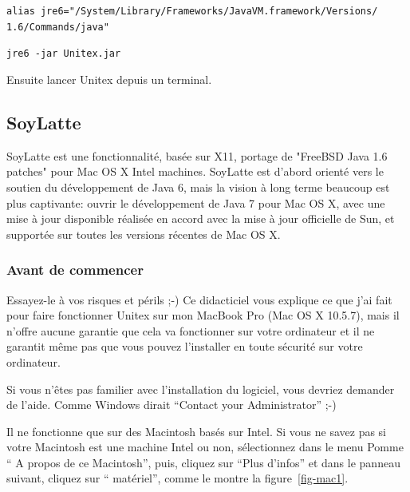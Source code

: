 \bigskip
\noindent \verb+alias jre6="/System/Library/Frameworks/JavaVM.framework/Versions/+
\noindent \verb+1.6/Commands/java"+
   
\bigskip
\noindent \verb+jre6 -jar Unitex.jar+

\bigskip
\noindent Ensuite lancer Unitex depuis un terminal.

\subsection{SoyLatte}
\bigskip{}
\noindent SoyLatte est une fonctionnalité, basée sur X11, portage de "FreeBSD Java 1.6 patches" pour
Mac OS X Intel machines. SoyLatte est d'abord orienté vers le soutien du développement de Java 6,
mais la vision à long terme beaucoup est plus captivante: ouvrir le développement de Java 7 pour Mac OS X, avec une mise à jour disponible réalisée en accord avec la mise à jour officielle de Sun, et
supportée sur toutes les versions récentes de Mac OS X.

\subsubsection{Avant de commencer}
\noindent Essayez-le à vos risques et périls ;-)
Ce didacticiel vous explique ce que j'ai fait pour faire fonctionner Unitex sur mon MacBook Pro (Mac
OS X 10.5.7), mais il n'offre aucune garantie que cela va fonctionner sur votre ordinateur et il ne
garantit même pas que vous pouvez l'installer en toute sécurité sur votre ordinateur.

\bigskip
\noindent Si vous n'êtes pas familier avec l'installation du logiciel, vous devriez demander de
l'aide. Comme  Windows dirait ``Contact your Administrator'' ;-)

\bigskip
\noindent Il ne fonctionne que sur des Macintosh basés sur Intel. Si vous ne savez pas si votre
Macintosh est une machine Intel ou non, sélectionnez dans le menu Pomme `` A propos de ce Macintosh'', puis, cliquez sur ``Plus d'infos'' et dans le panneau suivant, cliquez sur ``
matériel'', comme le montre la figure~\ref{fig-mac1}.


